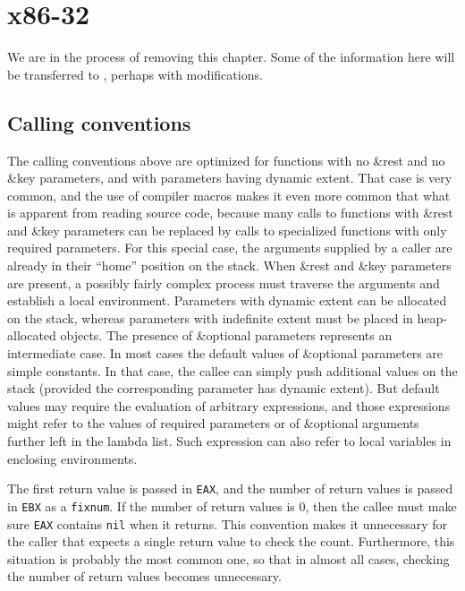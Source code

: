 \chapter{x86-32}
\label{chap-backend-x86}

We are in the process of removing this chapter.  Some of the
information here will be transferred to
, perhaps with modifications.

\section{Calling conventions}

The calling conventions above are optimized for functions with no
\&rest and no \&key parameters, and with parameters having dynamic
extent.  That case is very common, and the use of compiler macros
makes it even more common that what is apparent from reading source
code, because many calls to functions with \&rest and \&key parameters
can be replaced by calls to specialized functions with only required
parameters.  For this special case, the arguments supplied by a caller
are already in their ``home'' position on the stack.  When \&rest and
\&key parameters are present, a possibly fairly complex process must
traverse the arguments and establish a local environment.  Parameters
with dynamic extent can be allocated on the stack, whereas parameters
with indefinite extent must be placed in heap-allocated objects.
  The presence of
\&optional parameters represents an intermediate case.  In most cases
the default values of \&optional parameters are simple constants.  In
that case, the callee can simply push additional values on the stack
(provided the corresponding parameter has dynamic extent).  But
default values may require the evaluation of arbitrary expressions,
and those expressions might refer to the values of required parameters
or of \&optional arguments further left in the lambda list.  Such
expression can also refer to local variables in enclosing
environments.

The first return value is passed in \texttt{EAX}, and the number of
return values is passed in \texttt{EBX} as a \texttt{fixnum}.  If the
number of return values is $0$, then the callee must make sure
\texttt{EAX} contains \texttt{nil} when it returns.  This convention
makes it unnecessary for the caller that expects a single return value
to check the count.  Furthermore, this situation is probably the most
common one, so that in almost all cases, checking the number of return
values becomes unnecessary.

